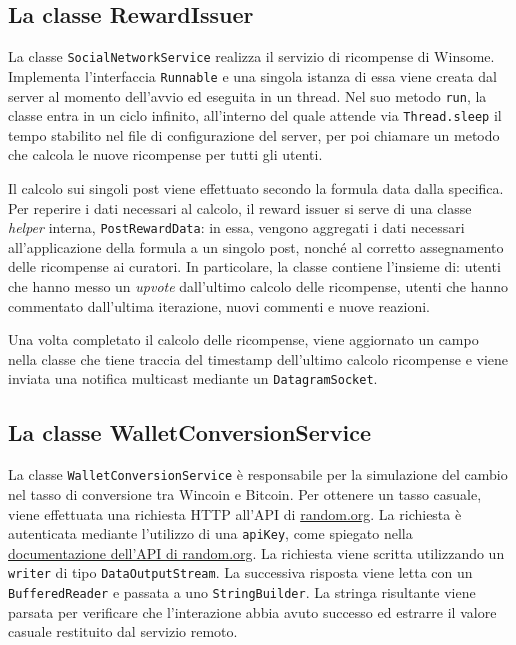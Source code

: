 \documentclass[a4paper,8pt]{article} %
\def\code#1{\texttt{#1}}
\begin{document}
\subsection{La classe RewardIssuer}
La classe \code{SocialNetworkService} realizza il servizio di ricompense di Winsome. Implementa l'interfaccia \code{Runnable} e una singola istanza di essa viene creata dal server al momento dell'avvio ed eseguita in un thread.
Nel suo metodo \code{run}, la classe entra in un ciclo infinito, all'interno del quale attende via \code{Thread.sleep} il tempo stabilito nel file di configurazione del server, per poi chiamare un metodo che calcola
le nuove ricompense per tutti gli utenti.
\par Il calcolo sui singoli post viene effettuato secondo la formula data dalla specifica. Per reperire i dati necessari al calcolo, il reward issuer si serve di una classe \emph{helper} interna, \code{PostRewardData}: in essa,
vengono aggregati i dati necessari all'applicazione della formula a un singolo post, nonché al corretto assegnamento delle ricompense ai curatori. In particolare, la classe contiene l'insieme di: utenti che hanno messo un \emph{upvote}
dall'ultimo calcolo delle ricompense, utenti che hanno commentato dall'ultima iterazione, nuovi commenti e nuove reazioni.
\par Una volta completato il calcolo delle ricompense, viene aggiornato un campo nella classe che tiene traccia del timestamp dell'ultimo calcolo ricompense e viene inviata una notifica multicast mediante un \code{DatagramSocket}.

\subsection{La classe WalletConversionService}
La classe \code{WalletConversionService} è responsabile per la simulazione del cambio nel tasso di conversione tra Wincoin e Bitcoin.
Per ottenere un tasso casuale, viene effettuata una richiesta HTTP all'API di \href{https://random.org}{random.org}. La richiesta è autenticata mediante l'utilizzo di una \code{apiKey}, come spiegato nella
\href{https://api.random.org/json-rpc/4/basic}{documentazione dell'API di random.org}. La richiesta viene scritta utilizzando un \code{writer} di tipo \code{DataOutputStream}. La successiva risposta viene letta
con un \code{BufferedReader} e passata a uno \code{StringBuilder}. La stringa risultante viene parsata per verificare che l'interazione abbia avuto successo ed estrarre il valore casuale restituito dal servizio remoto.
\end{document}
